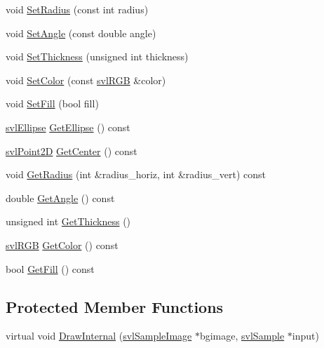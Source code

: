 \begin{DoxyCompactItemize}
\item 
void \hyperlink{classsvl_overlay_static_ellipse_a378a0fe17fab27a3e27b86437320bb18}{Set\-Radius} (const int radius)
\item 
void \hyperlink{classsvl_overlay_static_ellipse_a244f954cee64fb95083c2deca5ff98c8}{Set\-Angle} (const double angle)
\item 
void \hyperlink{classsvl_overlay_static_ellipse_a19d204f52ba31be5a99d8515f6d6721d}{Set\-Thickness} (unsigned int thickness)
\item 
void \hyperlink{classsvl_overlay_static_ellipse_ad7f462bef9e31a544baadb1dc8fe3766}{Set\-Color} (const \hyperlink{structsvl_r_g_b}{svl\-R\-G\-B} \&color)
\item 
void \hyperlink{classsvl_overlay_static_ellipse_a7f4d8f9af622a71285f9929ea097ebe3}{Set\-Fill} (bool fill)
\item 
\hyperlink{structsvl_ellipse}{svl\-Ellipse} \hyperlink{classsvl_overlay_static_ellipse_a2719df986a1af52cb7d8b1514d8db4c3}{Get\-Ellipse} () const 
\item 
\hyperlink{structsvl_point2_d}{svl\-Point2\-D} \hyperlink{classsvl_overlay_static_ellipse_a6d901d9551dc43c6658982d4c363cfda}{Get\-Center} () const 
\item 
void \hyperlink{classsvl_overlay_static_ellipse_a5df9071c8ed2a486eff8cb84f3928d4a}{Get\-Radius} (int \&radius\-\_\-horiz, int \&radius\-\_\-vert) const 
\item 
double \hyperlink{classsvl_overlay_static_ellipse_af859fde9c441ebbb11b6f2899f267d1f}{Get\-Angle} () const 
\item 
unsigned int \hyperlink{classsvl_overlay_static_ellipse_ac45ad83fb27320a377ad47ba91201653}{Get\-Thickness} ()
\item 
\hyperlink{structsvl_r_g_b}{svl\-R\-G\-B} \hyperlink{classsvl_overlay_static_ellipse_ab2f93640fd421110a023e96d4443c295}{Get\-Color} () const 
\item 
bool \hyperlink{classsvl_overlay_static_ellipse_ad9b60a15912d16ddd793bda9cb81b7e1}{Get\-Fill} () const 
\end{DoxyCompactItemize}
\subsection*{Protected Member Functions}
\begin{DoxyCompactItemize}
\item 
virtual void \hyperlink{classsvl_overlay_static_ellipse_aaa04be283fc452b67eef406c57e57361}{Draw\-Internal} (\hyperlink{classsvl_sample_image}{svl\-Sample\-Image} $\ast$bgimage, \hyperlink{classsvl_sample}{svl\-Sample} $\ast$input)
\end{DoxyCompactItemize}
